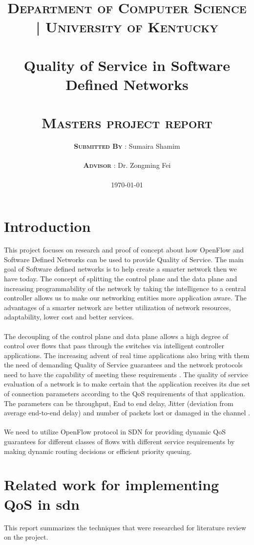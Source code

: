 \documentclass[paper=a4, fontsize=12pt]{scrartcl}	%
\title{
		\usefont{OT1}{bch}{b}{n}
		\normalfont \normalsize \textsc{\textbf{Department of Computer Science | University of Kentucky}} \\ [28pt]
		\horrule{0.5pt} \\[0.4cm]
		\huge Quality of Service in Software Defined Networks\\
		\horrule{2pt} \\[0.5cm]
		\normalfont \normalsize \textsc{\textbf{Masters project report}}
}
\author{
		\normalfont \normalsize \textsc{\textbf{Submitted By}} 
		\normalfont 								\normalsize
       	{: Sumaira Shamim}\\[-3pt]		\normalsize \\
       	\normalfont \normalsize \textsc{\textbf{Advisor}} 
       	\normalfont 								\normalsize
       	{: Dr. Zongming Fei}\\[-3pt]		\normalsize \\
  \today      
}
\date{}
\numberwithin{equation}{section}		%
\numberwithin{figure}{section}			%
\numberwithin{table}{section}				%
\begin{document}
\maketitle
\thispagestyle{empty}

\newpage
\setcounter{page}{1}
\tableofcontents
\newpage

\section{Introduction}
This project focuses on research and proof of concept about how OpenFlow and Software Defined Networks can be used to provide Quality of Service. The main goal of Software defined networks is to help create a smarter network then we have today. The concept of splitting the control plane and the data plane and increasing programmability of the network by taking the intelligence to a central controller allows us to make our networking entities more application aware. The advantages of a smarter network are better utilization of network resources, adaptability, lower cost and better services.
\\
\\
The decoupling of the control plane and data plane allows a high degree of control over flows that pass through the switches via intelligent controller applications. The increasing advent of real time applications also bring with them the need of demanding Quality of Service guarantees and the network protocols need to have the capability of meeting these requirements \cite{thesis}. The quality of service evaluation of a network is to make certain that the application receives its due set of connection parameters according to the QoS requirements of that application. The parameters can be throughput, End to end delay, Jitter (deviation from average end-to-end delay) and number of packets lost or damaged in the channel \cite{multipath}. 
\\
\\
We need to utilize OpenFlow protocol in SDN for providing dynamic QoS guarantees for different classes of flows with different service requirements by making dynamic routing decisions or efficient priority queuing. 

\section{Related work for implementing QoS in sdn}
This report summarizes the techniques that were researched for literature review on the project.
\end{document}

